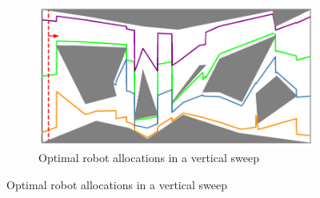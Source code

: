 \begin{figure}[t]
\vspace{1.5mm}
    \centering

    \begin{subfigure}[t]{0.7\textwidth}
         \centering
         \includegraphics[width=\textwidth]{chapters/sc/fig/instance_2-eps-converted-to.pdf}
         \caption{Optimal robot allocations in a vertical sweep}
         \label{fig:sc-vertical}
     \end{subfigure}
    
    \medskip
    

\end{figure}
